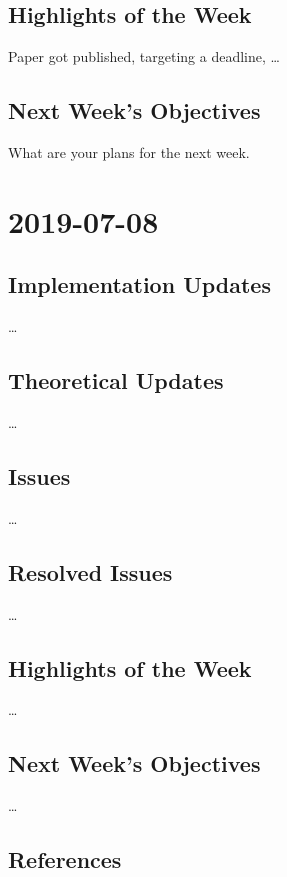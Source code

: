 \documentclass[12pt]{report}
\begin{document}
{\section*{Highlights of the Week}
Paper got published, targeting a deadline, \dots

\section*{Next Week's Objectives}
What are your plans for the next week.

\chapter{2019-07-08}
\section*{Implementation Updates}
\dots

\section*{Theoretical Updates}
\dots

\section*{Issues}
\dots

\section*{Resolved Issues}
\dots

\section*{Highlights of the Week}
\dots

\section*{Next Week's Objectives}
\dots

\newpage
\section*{References}

}
\end{document}
